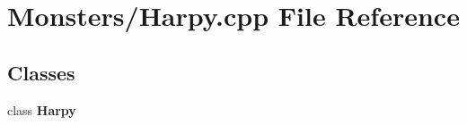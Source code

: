 \section{Monsters/\-Harpy.cpp File Reference}
\label{_harpy_8cpp}
\subsection*{Classes}
\begin{DoxyCompactItemize}
\item 
class {\bf Harpy}
\end{DoxyCompactItemize}
